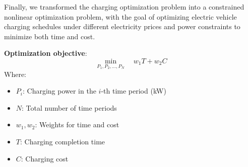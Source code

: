 \documentclass[
	english,
	ruledheaders=section,%
	class=report,%
	thesis={type=Report},%
	accentcolor=9c,%
	custommargins=true,%
	marginpar=false,%
	parskip=half-,%
	fontsize=11pt,%
	logofile={img/tuda_logo.pdf}, %
]{tudapub}
\begin{document}

Finally, we transformed the charging optimization problem into a constrained nonlinear optimization problem, with the goal of optimizing electric vehicle charging schedules under different electricity prices and power constraints to minimize both time and cost.

\textbf{Optimization objective}:
\begin{equation}
\min_{P_1, P_2, \dots, P_N} \quad w_1 T + w_2 C
\end{equation}
Where:
\begin{itemize}
    \item $P_i$: Charging power in the $i$-th time period (kW)
    \item $N$: Total number of time periods
    \item $w_1, w_2$: Weights for time and cost
    \item $T$: Charging completion time
    \item $C$: Charging cost
\end{itemize}
\end{document}

